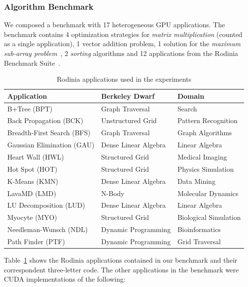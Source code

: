\subsubsection{Algorithm Benchmark}

We composed a benchmark with 17 heterogeneous GPU applications.  The benchmark
contains 4 optimization strategies for \emph{matrix multiplication} (counted as
a single application), 1 vector addition problem, 1 solution for the
\emph{maximum sub-array problem}~\cite{ferreira2014parallel}, 2 \emph{sorting}
algorithms and 12 applications from the Rodinia Benchmark
Suite~\cite{che2009rodinia}.

\begin{table}[htpb]
    \centering
    \footnotesize
        \begin{tabular}{lll}
            \toprule
            \textbf{Application} & \textbf{Berkeley Dwarf\cite{asanovic2009view}} & \textbf{Domain} \\\midrule
            B+Tree (BPT) & Graph Traversal& Search \\
            Back Propagation (BCK) & Unstructured Grid & Pattern Recognition \\
            Breadth-First Search (BFS) & Graph Traversal & Graph Algorithms \\
            Gaussian Elimination (GAU) & Dense Linear Algebra & Linear Algebra \\
            Heart Wall (HWL) & Structured Grid & Medical Imaging \\
            Hot Spot (HOT) & Structured Grid & Physics Simulation \\
            K-Means (KMN) & Dense Linear Algebra & Data Mining \\
            LavaMD (LMD) & N-Body & Molecular Dynamics \\
            LU Decomposition (LUD) & Dense Linear Algebra & Linear Algebra \\
            Myocyte (MYO) & Structured Grid & Biological Simulation \\
            Needleman-Wunsch (NDL) & Dynamic Programming & Bioinformatics \\
            Path Finder (PTF) & Dynamic Programming & Grid Traversal \\\bottomrule
        \end{tabular}
    \caption{Rodinia applications used in the experiments}
    \label{tab:Rodinia}
\end{table}

Table~\ref{tab:Rodinia} shows the Rodinia applications contained in our
benchmark and their correspondent three-letter code.  The other applications in
the benchmark were CUDA implementations of the following:

